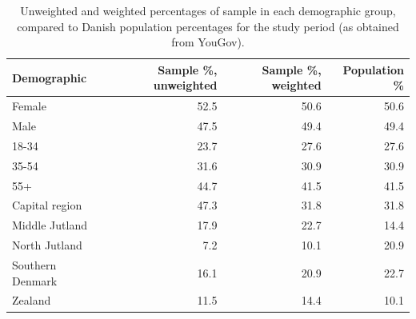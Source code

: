 \begin{table}[ht]
\centering
\begin{tabular}{lrrr}
  \hline
Demographic & Sample \%, unweighted & Sample \%, weighted & Population \% \\ 
  \hline
Female & 52.5 & 50.6 & 50.6 \\ 
  Male & 47.5 & 49.4 & 49.4 \\ 
   \hline
18-34 & 23.7 & 27.6 & 27.6 \\ 
  35-54 & 31.6 & 30.9 & 30.9 \\ 
  55+ & 44.7 & 41.5 & 41.5 \\ 
   \hline
Capital region & 47.3 & 31.8 & 31.8 \\ 
  Middle Jutland & 17.9 & 22.7 & 14.4 \\ 
  North Jutland & 7.2 & 10.1 & 20.9 \\ 
  Southern Denmark & 16.1 & 20.9 & 22.7 \\ 
  Zealand & 11.5 & 14.4 & 10.1 \\ 
   \hline
\end{tabular}
\caption{Unweighted and weighted percentages of sample in each demographic
                   group, compared to Danish population percentages for the study period (as obtained
                   from YouGov).} 
\label{tab:demographics}
\end{table}
